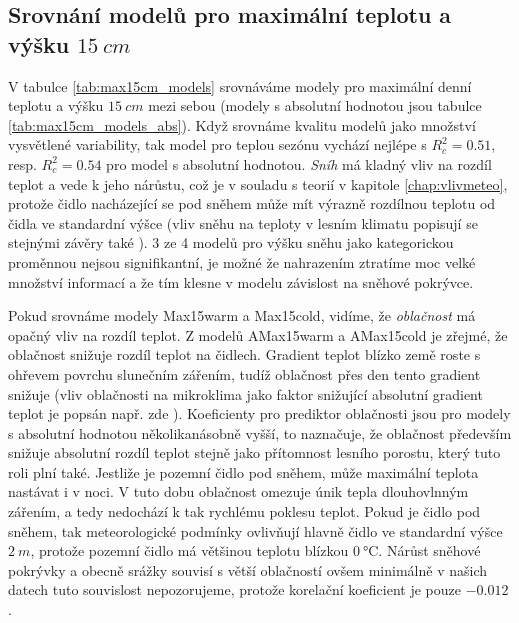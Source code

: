 \subsection{Srovnání modelů pro maximální teplotu a výšku $\SI{15}{cm}$}
V tabulce \ref{tab:max15cm_models} srovnáváme modely pro maximální denní teplotu a výšku $\SI{15}{cm}$ mezi sebou (modely s absolutní hodnotou jsou tabulce \ref{tab:max15cm_models_abs}). Když srovnáme kvalitu modelů jako množství vysvětlené variability, tak model pro teplou sezónu vychází nejlépe s $R_c^2 = 0.51$, resp. $R_c^2 = 0.54$ pro model s absolutní hodnotou. \textit{Sníh} má kladný vliv na rozdíl teplot a vede k jeho nárůstu, což je v souladu s teorií v kapitole \ref{chap:vlivmeteo}, protože čidlo nacházející se pod sněhem může mít výrazně rozdílnou teplotu od čidla ve standardní výšce (vliv sněhu na teploty v lesním klimatu popisují se stejnými závěry také \cite{snow_deFrenneForestMicroclimates}). 3 ze 4 modelů pro výšku sněhu jako kategorickou proměnnou nejsou signifikantní, je možné že nahrazením ztratíme moc velké množství informací a že tím klesne v modelu závislost na sněhové pokrývce.

Pokud srovnáme modely Max15warm a Max15cold, vidíme, že \textit{oblačnost} má opačný vliv na rozdíl teplot. Z modelů AMax15warm a AMax15cold je zřejmé, že oblačnost snižuje rozdíl teplot na čidlech. Gradient teplot blízko země roste s ohřevem povrchu slunečním zářením, tudíž oblačnost přes den tento gradient snižuje (vliv oblačnosti na mikroklima jako faktor snižující absolutní gradient teplot je popsán např. zde \cite{snow_deFrenneForestMicroclimates, cloud_overwinteringclusters}). Koeficienty pro prediktor oblačnosti jsou pro modely s absolutní hodnotou několikanásobně vyšší, to naznačuje, že oblačnost především snižuje absolutní rozdíl teplot stejně jako přítomnost lesního porostu, který tuto roli plní také. Jestliže je pozemní čidlo pod sněhem, může maximální teplota nastávat i v noci. V tuto dobu oblačnost omezuje únik tepla dlouhovlnným zářením, a tedy nedochází k tak rychlému poklesu teplot. Pokud je čidlo pod sněhem, tak meteorologické podmínky ovlivňují hlavně čidlo ve standardní výšce $\SI{2}{m}$, protože pozemní čidlo má většinou teplotu blízkou $\SI{0}{\celsius}$. Nárůst sněhové pokrývky a obecně srážky souvisí s větší oblačností ovšem minimálně v našich datech tuto souvislost nepozorujeme, protože korelační koeficient je pouze $-0.012$.

